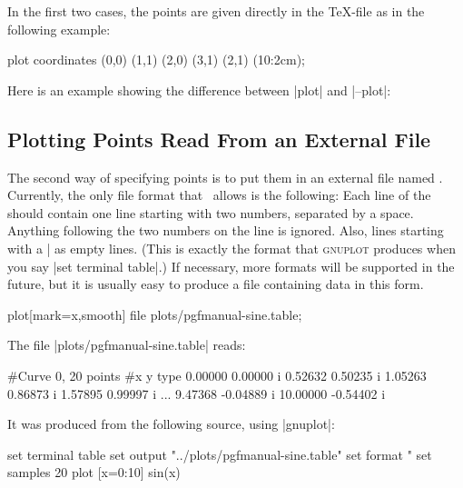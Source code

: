 In the first two cases, the points are given directly in the \TeX-file
as in the following example:

\begin{codeexample}[]
\tikz \draw plot coordinates {(0,0) (1,1) (2,0) (3,1) (2,1) (10:2cm)};
\end{codeexample}

Here is an example showing the difference between |plot| and |--plot|:

\begin{codeexample}[]
\end{codeexample}


\subsection{Plotting Points Read From an External File}

The second way of specifying points is to put them in an external
file named . Currently, the only file format that
\tikzname\ allows is the following: Each line of the 
should contain one line starting with two numbers, separated by a
space. Anything following the two numbers on the line is
ignored. Also, lines starting with a |%
as empty lines. (This is exactly the format that \textsc{gnuplot}
produces when you say |set terminal table|.) If necessary, more
formats will be supported in the future, but it is usually easy to
produce a file containing data in this form.

\begin{codeexample}[]
\tikz \draw plot[mark=x,smooth] file {plots/pgfmanual-sine.table};
\end{codeexample}

The file |plots/pgfmanual-sine.table| reads:
\begin{codeexample}
#Curve 0, 20 points
#x y type
0.00000 0.00000  i
0.52632 0.50235  i
1.05263 0.86873  i
1.57895 0.99997  i
...
9.47368 -0.04889  i
10.00000 -0.54402  i
\end{codeexample}
It was produced from the following source, using |gnuplot|:
\begin{codeexample}
set terminal table
set output "../plots/pgfmanual-sine.table"
set format "%
set samples 20
plot [x=0:10] sin(x)
\end{codeexample}


